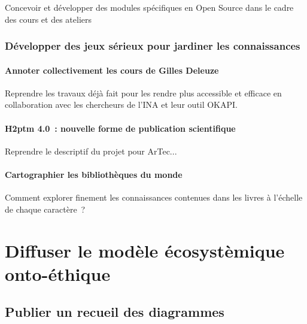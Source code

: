 \documentclass[
  a4paper,
  DIV=11,
  numbers=noendperiod]{scrreprt}
\begin{document}
Concevoir et développer des modules spécifiques en Open Source dans le
cadre des cours et des ateliers

\subsection{Développer des jeux sérieux pour jardiner les
connaissances}\label{duxe9velopper-des-jeux-suxe9rieux-pour-jardiner-les-connaissances}

\subsubsection{Annoter collectivement les cours de Gilles
Deleuze}\label{annoter-collectivement-les-cours-de-gilles-deleuze}

Reprendre les travaux déjà fait pour les rendre plus accessible et
efficace en collaboration avec les chercheurs de l'INA et leur outil
OKAPI.

\subsubsection{H2ptm 4.0~: nouvelle forme de publication
scientifique}\label{h2ptm-4.0-nouvelle-forme-de-publication-scientifique}

Reprendre le descriptif du projet pour ArTec...

\subsubsection{Cartographier les bibliothèques du
monde}\label{cartographier-les-bibliothuxe8ques-du-monde}

Comment explorer finement les connaissances contenues dans les livres à
l'échelle de chaque caractère~?

\subsubsection{}\label{section}

\chapter{Diffuser le modèle écosystèmique
onto-éthique}\label{sec-diffuser}

\section{Publier un recueil des
diagrammes}\label{publier-un-recueil-des-diagrammes}
\end{document}
